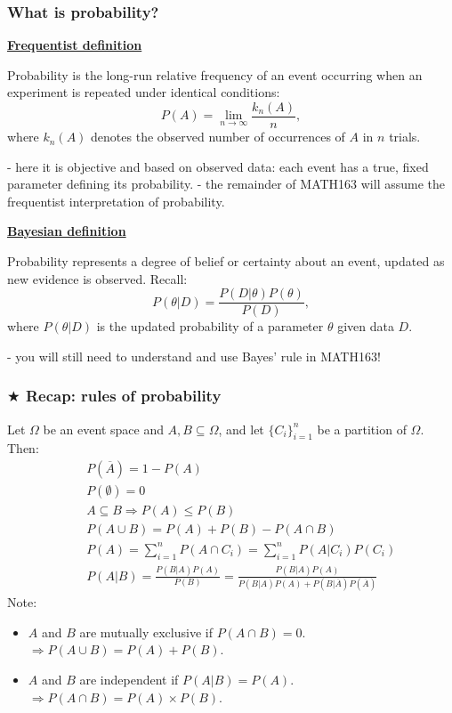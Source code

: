 \documentclass[t,8pt]{beamer}
\begin{document}
\begin{frame}
	\frametitle{What is probability?}
	{\bf\underline{Frequentist definition}} \par
	Probability is the long-run relative frequency of an event occurring when an experiment is repeated under identical conditions:
	$$P(A)=\lim_{n\rightarrow\infty}\frac{k_n(A)}n,$$
	where $k_n(A)$ denotes the observed number of occurrences of $A$ in $n$ trials. \par
	{\small\color{NavyBlue} - here it is objective and based on observed data: each event has a true, fixed parameter defining its probability.  
		- the remainder of MATH163 will assume the frequentist interpretation of probability.} \par
	{\bf\underline{Bayesian definition}} \par
	Probability represents a degree of belief or certainty about an event, updated as new evidence is observed. Recall:
	$$P(\theta\vert D)=\frac{P(D\vert\theta)P(\theta)}{P(D)},$$
	where $P(\theta\vert D)$ is the updated probability of a parameter $\theta$ given data $D$. \par
	{\small\color{NavyBlue} - you will still need to understand and use Bayes' rule in MATH163!}
\end{frame}

\begin{frame}
	\frametitle{$\bigstar$ Recap: rules of probability}
	Let $\Omega$ be an event space and $A,B\subseteq \Omega$, and let $\lbrace C_i\rbrace_{i=1}^n$ be a partition of $\Omega$. Then:
	\begin{eqnarray}
		&&P(\overline A)=1-P(A)\\
		&&P(\emptyset)=0\\
		&&A\subseteq B\Rightarrow P(A)\leq P(B)\\
		&&P(A\cup B)=P(A)+P(B)-P(A\cap B)\\
		&&P(A)=\sum_{i=1}^nP(A\cap C_i)=\sum_{i=1}^nP(A\vert C_i)P(C_i)\\
		&&P(A\vert B)=\frac{P(B\vert A)P(A)}{P(B)}
		=\frac{P(B\vert A)P(A)}{P(B\vert A)P(A)+P(B\vert\overline A)P(\overline A)}
	\end{eqnarray}
	Note:
	\begin{itemize}
		\item $A$ and $B$ are mutually exclusive if $P(A\cap B)=0$.  
		$\Rightarrow P(A\cup B)=P(A)+P(B)$.
		\item $A$ and $B$ are independent if $P(A\vert B)=P(A)$.  
		$\Rightarrow P(A\cap B)=P(A)\times P(B)$.
	\end{itemize}
\end{frame}
\end{document}
